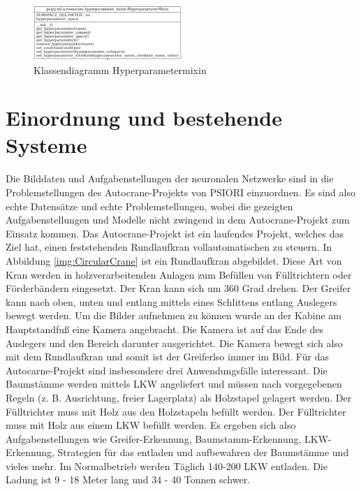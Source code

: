 	\begin{figure}[h]
		\centering
		\includegraphics[width=0.5\textwidth, center]{bilder/Klassendiagramme/Hyperparametermixin.png}
		\caption[Klassendiagramm Hyperparametermixin]{Klassendiagramm Hyperparametermixin}
		\label{img:KlassendiagrammHyperparametermixin}
	\end{figure}  
	
	\section{Einordnung und bestehende Systeme}
	\label{sec:BestehendesSystem}
	Die Bilddaten und Aufgabenstellungen der neuronalen Netzwerke sind in die Problemstellungen des Autocrane-Projekts von PSIORI einzuordnen. Es sind also echte Datensätze und echte Problemstellungen, wobei die gezeigten Aufgabenstellungen und Modelle nicht zwingend in dem Autocrane-Projekt zum Einsatz kommen. Das Autocrane-Projekt ist ein laufendes Projekt, welches das Ziel hat, einen feststehenden Rundlaufkran vollautomatischen zu steuern. In Abbildung \ref{img:CircularCrane} ist ein Rundlaufkran abgebildet. Diese Art von Kran werden in holzverarbeitenden Anlagen zum Befüllen von Fülltrichtern oder Förderbändern eingesetzt. Der Kran kann sich um 360 Grad drehen. Der Greifer kann nach oben, unten und entlang mittels eines Schlittens entlang Auslegers bewegt werden. Um die Bilder aufnehmen zu können wurde an der Kabine am Hauptstandfuß eine Kamera angebracht. Die Kamera ist auf das Ende des Auslegers und den Bereich darunter ausgerichtet. Die Kamera bewegt sich also mit dem Rundlaufkran und somit ist der Greiferlso immer im Bild. Für das Autocarne-Projekt sind insbesondere drei Anwendungsfälle interessant. Die Baumstämme werden mittels LKW angeliefert und müssen nach vorgegebenen Regeln (z. B. Ausrichtung, freier Lagerplatz) als Holzstapel gelagert werden. Der Fülltrichter muss mit Holz aus den Holzstapeln befüllt werden. Der Fülltrichter muss mit Holz aus einem LKW befüllt werden. Es ergeben sich also Aufgabenstellungen wie Greifer-Erkennung, Baumstamm-Erkennung, LKW-Erkennung, Strategien für das entladen und aufbewahren der Baumstämme und vieles mehr. Im Normalbetrieb werden Täglich 140-200 LKW entladen. Die Ladung ist 9 - 18 Meter lang und 34 - 40 Tonnen schwer.  \cite{PSIORIGmbH.2020}
